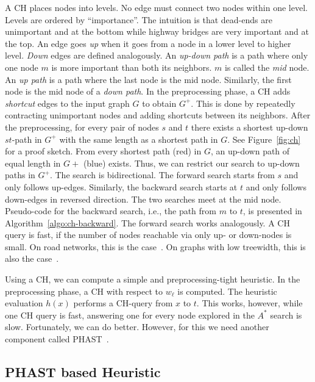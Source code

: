 \documentclass[letterpaper]{article} %
\begin{document}
A CH places nodes into levels.
No edge must connect two nodes within one level.
Levels are ordered by ``importance''.
The intuition is that dead-ends are unimportant and at the bottom while highway bridges are very important and at the top.
An edge goes \emph{up} when it goes from a node in a lower level to higher level.
\emph{Down} edges are defined analogously.
An \emph{up-down path} is a path where only one node $m$ is more important than both its neighbors.
$m$ is called the \emph{mid} node.
An \emph{up path} is a path where the last node is the mid node.
Similarly, the first node is the mid node of a \emph{down path}.
%
In the preprocessing phase, a CH adds \emph{shortcut} edges to the input graph $G$ to obtain $G^+$.
This is done by repeatedly contracting unimportant nodes and adding shortcuts between its neighbors.
After the preprocessing, for every pair of nodes $s$ and $t$ there exists a shortest up-down $st$-path in $G^+$ with the same length as a shortest path in $G$.
See Figure~\ref{fig:ch} for a proof sketch.
From every shortest path (red) in $G$, an up-down path of equal length in $G+$ (blue) exists.
Thus, we can restrict our search to up-down paths in $G^+$.
The search is bidirectional.
The forward search starts from $s$ and only follows up-edges.
Similarly, the backward search starts at $t$ and only follows down-edges in reversed direction.
The two searches meet at the mid node.
Pseudo-code for the backward search, i.e., the path from $m$ to $t$, is presented in Algorithm~\ref{algo:ch-backward}.
The forward search works analogously.
%
A CH query is fast, if the number of nodes reachable via only up- or down-nodes is small.
On road networks, this is the case~\cite{gssv-erlrn-12,dgrw-gpnc-11,dgpw-crprn-13}.
On graphs with low treewidth, this is also the case~\cite{dsw-cch-15,hs-gbpo-18}.

Using a CH, we can compute a simple and preprocessing-tight heuristic.
In the preprocessing phase, a CH with respect to $w_\ell$ is computed.
The heuristic evaluation $h(x)$ performs a CH-query from $x$ to $t$.
%
This works, however, while one CH query is fast, answering one for every node explored in the $A^*$ search is slow.
Fortunately, we can do better.
However, for this we need another component called PHAST~\cite{dgnw-phast-13}.

\subsection{PHAST based Heuristic}
\end{document}
